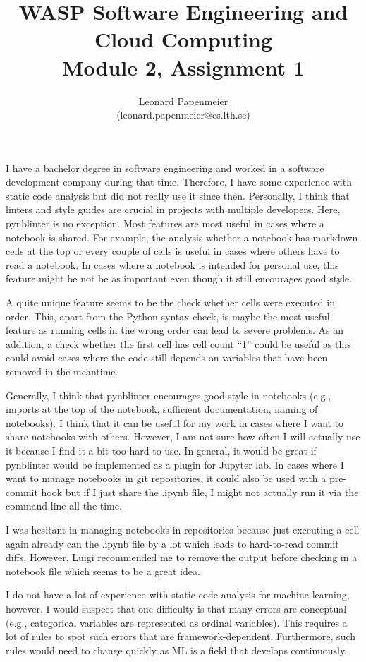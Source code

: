 \documentclass{article}
\title{WASP Software Engineering and Cloud Computing\\Module 2, Assignment 1}
\author{Leonard Papenmeier\\(leonard.papenmeier@cs.lth.se)}
\date{}
\begin{document}
    \maketitle

    I have a bachelor degree in software engineering and worked in a software development company during that time.
    Therefore, I have some experience with static code analysis but did not really use it since then.
    Personally, I think that linters and style guides are crucial in projects with multiple developers.
    Here, pynblinter is no exception.
    Most features are most useful in cases where a notebook is shared.
    For example, the analysis whether a notebook has markdown cells at the top or every couple of cells is useful in cases where others have to read a notebook.
    In cases where a notebook is intended for personal use, this feature might be not be as important even though it still encourages good style.

    A quite unique feature seems to be the check whether cells were executed in order.
    This, apart from the Python syntax check, is maybe the most useful feature as running cells in the wrong order can lead to severe problems.
    As an addition, a check whether the first cell has cell count ``1'' could be useful as this could avoid cases where the code still depends on variables that have been removed in the meantime.

    Generally, I think that pynblinter encourages good style in notebooks (e.g., imports at the top of the notebook, sufficient documentation, naming of notebooks).
    I think that it can be useful for my work in cases where I want to share notebooks with others.
    However, I am not sure how often I will actually use it because I find it a bit too hard to use.
    In general, it would be great if pynblinter would be implemented as a plugin for Jupyter lab.
    In cases where I want to manage notebooks in git repositories, it could also be used with a pre-commit hook but if I just share the .ipynb file, I might not actually run it via the command line all the time.

    I was hesitant in managing notebooks in repositories because just executing a cell again already can the .ipynb file by a lot which leads to hard-to-read commit diffs.
    However, Luigi recommended me to remove the output before checking in a notebook file which seems to be a great idea.

    I do not have a lot of experience with static code analysis for machine learning, however, I would suspect that one difficulty is that many errors are conceptual (e.g., categorical variables are represented as ordinal variables).
    This requires a lot of rules to spot such errors that are framework-dependent.
    Furthermore, such rules would need to change quickly as ML is a field that develops continuously.
\end{document}
